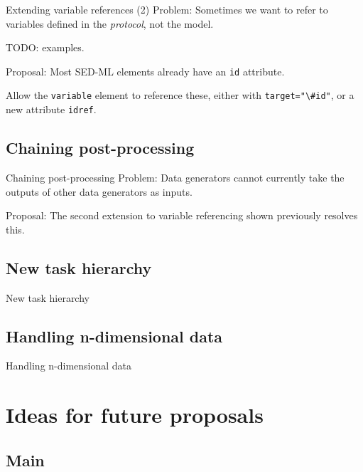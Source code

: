 \documentclass[t,xcolor={usenames,dvipsnames}]{beamer}
\newcommand{\sedml}[1]{\lstinline[basicstyle=\color{blue}]!#1!}
\begin{document}
\begin{frame}{Extending variable references (2)}
\alert{Problem}:
 Sometimes we want to refer to variables defined in the
 \emph{protocol}, not the model.

 TODO: examples.

\alert{Proposal}:
 Most SED-ML elements already have an \sedml{id} attribute.

 Allow the \sedml{variable} element to reference these, either with
 \sedml{target="\#id"}, or a new attribute \sedml{idref}.
\end{frame}

\subsection{Chaining post-processing}

\begin{frame}{Chaining post-processing}
\alert{Problem}:
 Data generators cannot currently take the outputs of other data
 generators as inputs.

\alert{Proposal}:
 The second extension to variable referencing shown previously
 resolves this.
\end{frame}

\subsection{New task hierarchy}

\begin{frame}{New task hierarchy}
\end{frame}

\subsection{Handling n-dimensional data}

\begin{frame}{Handling n-dimensional data}
\end{frame}

\section{Ideas for future proposals}
\subsection*{Main}
\end{document}
